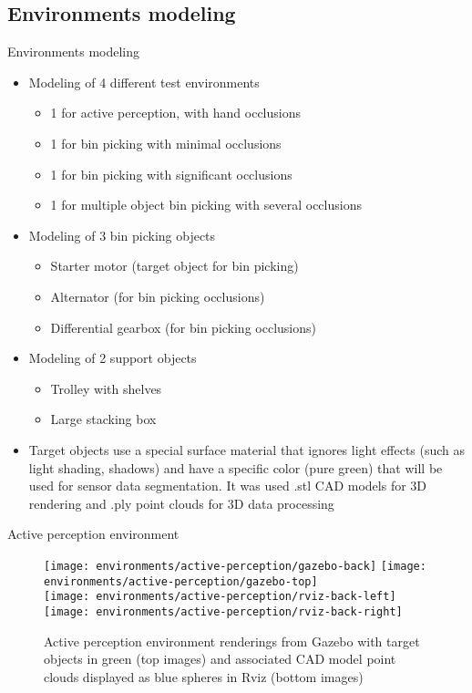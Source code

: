 \subsection*{Environments modeling}
\begin{frame}{Environments modeling}
	\begin{itemize}
		\item Modeling of 4 different test environments
			\begin{itemize}
				\item 1 for active perception, with hand occlusions
				\item 1 for bin picking with minimal occlusions
				\item 1 for bin picking with significant occlusions
				\item 1 for multiple object bin picking with several occlusions
			\end{itemize}
		\item Modeling of 3 bin picking objects
		\begin{itemize}
			\item Starter motor (target object for bin picking)
			\item Alternator (for bin picking occlusions)
			\item Differential gearbox (for bin picking occlusions)
		\end{itemize}
		\item Modeling of 2 support objects
		\begin{itemize}
			\item Trolley with shelves
			\item Large stacking box
		\end{itemize}
		\item Target objects use a special surface material that ignores light effects (such as light shading, shadows) and have a specific color (pure green) that will be used for sensor data segmentation. It was used .stl CAD models for 3D rendering and .ply point clouds for 3D data processing
	\end{itemize}
\end{frame}


\begin{frame}{Active perception environment}
	\begin{figure}
		\centering
		\texttt{[image: environments/active-perception/gazebo-back]}
		\texttt{[image: environments/active-perception/gazebo-top]}\\
		\texttt{[image: environments/active-perception/rviz-back-left]}
		\texttt{[image: environments/active-perception/rviz-back-right]}
		\caption{Active perception environment renderings from Gazebo with target objects in green (top images) and associated CAD model point clouds displayed as blue spheres in Rviz (bottom images)}
	\end{figure}
\end{frame}


